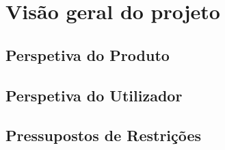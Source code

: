 \chapter{Visão geral do projeto}

\section{Perspetiva do Produto}

\section{Perspetiva do Utilizador}

\section{Pressupostos de Restrições}

